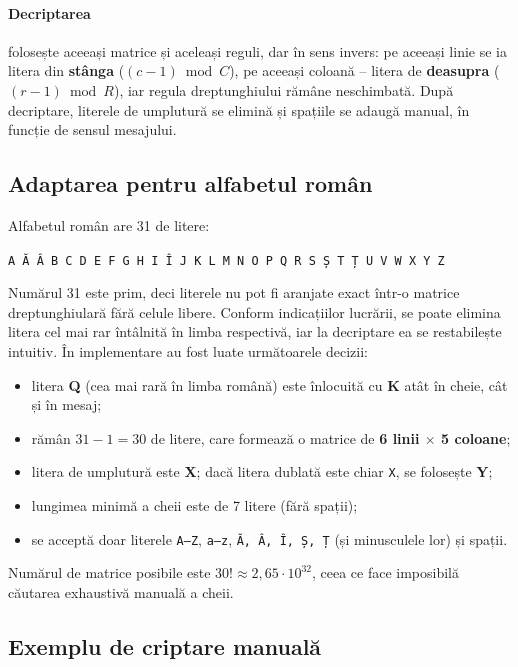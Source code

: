 \documentclass[12pt,a4paper]{article}
\begin{document}
\paragraph{Decriptarea} folosește aceeași matrice și aceleași reguli, dar în sens
invers: pe aceeași linie se ia litera din \textbf{stânga}
($(c - 1) \bmod C$), pe aceeași coloană -- litera de \textbf{deasupra}
($(r - 1) \bmod R$), iar regula dreptunghiului rămâne neschimbată. După decriptare,
literele de umplutură se elimină și spațiile se adaugă manual, în funcție de
sensul mesajului.

\subsection{Adaptarea pentru alfabetul român}

Alfabetul român are 31 de litere:
\begin{center}
\texttt{A Ă Â B C D E F G H I Î J K L M N O P Q R S Ș T Ț U V W X Y Z}
\end{center}

Numărul 31 este prim, deci literele nu pot fi aranjate exact într-o matrice
dreptunghiulară fără celule libere. Conform indicațiilor lucrării, se poate elimina
litera cel mai rar întâlnită în limba respectivă, iar la decriptare ea se restabilește
intuitiv. În implementare au fost luate următoarele decizii:
\begin{itemize}
    \item litera \textbf{Q} (cea mai rară în limba română) este înlocuită cu
    \textbf{K} atât în cheie, cât și în mesaj;
    \item rămân $31 - 1 = 30$ de litere, care formează o matrice de
    \textbf{6 linii $\times$ 5 coloane};
    \item litera de umplutură este \textbf{X}; dacă litera dublată este chiar
    \texttt{X}, se folosește \textbf{Y};
    \item lungimea minimă a cheii este de 7 litere (fără spații);
    \item se acceptă doar literele \texttt{A--Z}, \texttt{a--z},
    \texttt{Ă, Â, Î, Ș, Ț} (și minusculele lor) și spații.
\end{itemize}

Numărul de matrice posibile este $30! \approx 2{,}65 \cdot 10^{32}$, ceea ce face
imposibilă căutarea exhaustivă manuală a cheii.

\subsection{Exemplu de criptare manuală}
\end{document}
